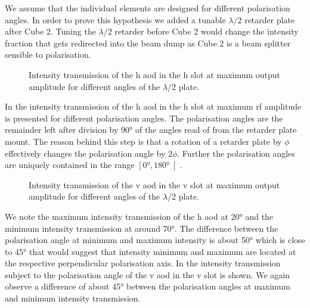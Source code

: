 We assume that the individual elements are designed for different
polarisation angles. In order to prove this hypothesis we added a tunable
$\lambda/2$ retarder plate after Cube \num{2}. Tuning the $\lambda/2$ retarder
before Cube \num{2} would change the intensity fraction that gets redirected into
the beam dump as Cube \num{2} is a beam splitter sensible to polarisation.
\begin{figure}[htb]
  \centering
  \begin{adjustbox}{width=\textwidth}
  \end{adjustbox}
  \caption{Intensity transmission of the \gls{h} \gls{aod} in the \gls{h} slot
    at maximum output amplitude for different angles of the $\lambda/2$ plate.
  }\label{fig:intensity_polarisation_h}
\end{figure}
In  the intensity transmission of the
\gls{h} \gls{aod} in the \gls{h} slot at maximum \gls{rf} amplitude is
presented for different polarisation angles. The polarisation angles are the
remainder left after division by \ang{90} of the angles read of from the
retarder plate mount. The reason behind this step is that a rotation of a
retarder plate by $\phi$ effectively changes the polarisation angle by
$2\phi$. Further the polarisation angles are uniquely contained in the range
$\left[\ang{0},\ang{180}\right[$.
\begin{figure}[htb]
  \centering
  \begin{adjustbox}{width=\textwidth}
  \end{adjustbox}
  \caption{Intensity transmission of the \gls{v} \gls{aod} in the \gls{v} slot
    at maximum output amplitude for different angles of the $\lambda/2$ plate.
  }\label{fig:intensity_polarisation_v}
\end{figure}
We note the maximum intensity transmission of the \gls{h} \gls{aod} at
\ang{20} and the minimum intensity transmission at around \ang{70}. The
difference between the polarisation angle at minimum and maximum intensity
is about \ang{50} which is close to \ang{45} that would suggest that
intensity minimum and maximum are located at the respective perpendicular
polarisation axis. In  the intensity
transmission subject to the polarisation angle of the \gls{v} \gls{aod} in
the \gls{v} slot is shown. We again observe a difference of about \ang{45}
between the polarisation angles at maximum and minimum intensity transmission.

